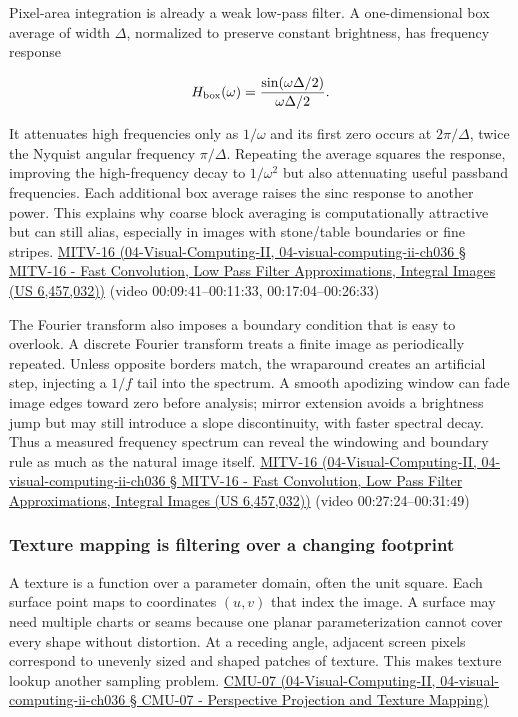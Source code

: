 Pixel-area integration is already a weak low-pass filter. A one-dimensional box average of width \(\Delta\), normalized to preserve constant brightness, has frequency response

\[
H_{\rm box}(\omega)=\frac{\sin(\omega\Delta/2)}{\omega\Delta/2}.
\]

It attenuates high frequencies only as \(1/\omega\) and its first zero occurs at \(2\pi/\Delta\), twice the Nyquist angular frequency \(\pi/\Delta\). Repeating the average squares the response, improving the high-frequency decay to \(1/\omega^2\) but also attenuating useful passband frequencies. Each additional box average raises the sinc response to another power. This explains why coarse block averaging is computationally attractive but can still alias, especially in images with stone/table boundaries or fine stripes. \href{}{MITV-16 (04-Visual-Computing-II, 04-visual-computing-ii-ch036 § MITV-16 - Fast Convolution, Low Pass Filter Approximations, Integral Images (US 6,457,032))} (video 00:09:41--00:11:33, 00:17:04--00:26:33)

The Fourier transform also imposes a boundary condition that is easy to overlook. A discrete Fourier transform treats a finite image as periodically repeated. Unless opposite borders match, the wraparound creates an artificial step, injecting a \(1/f\) tail into the spectrum. A smooth apodizing window can fade image edges toward zero before analysis; mirror extension avoids a brightness jump but may still introduce a slope discontinuity, with faster spectral decay. Thus a measured frequency spectrum can reveal the windowing and boundary rule as much as the natural image itself. \href{}{MITV-16 (04-Visual-Computing-II, 04-visual-computing-ii-ch036 § MITV-16 - Fast Convolution, Low Pass Filter Approximations, Integral Images (US 6,457,032))} (video 00:27:24--00:31:49)

\subsubsection{Texture mapping is filtering over a changing footprint}\label{texture-mapping-is-filtering-over-a-changing-footprint}

A texture is a function over a parameter domain, often the unit square. Each surface point maps to coordinates \((u,v)\) that index the image. A surface may need multiple charts or seams because one planar parameterization cannot cover every shape without distortion. At a receding angle, adjacent screen pixels correspond to unevenly sized and shaped patches of texture. This makes texture lookup another sampling problem. \href{}{CMU-07 (04-Visual-Computing-II, 04-visual-computing-ii-ch036 § CMU-07 - Perspective Projection and Texture Mapping)}

